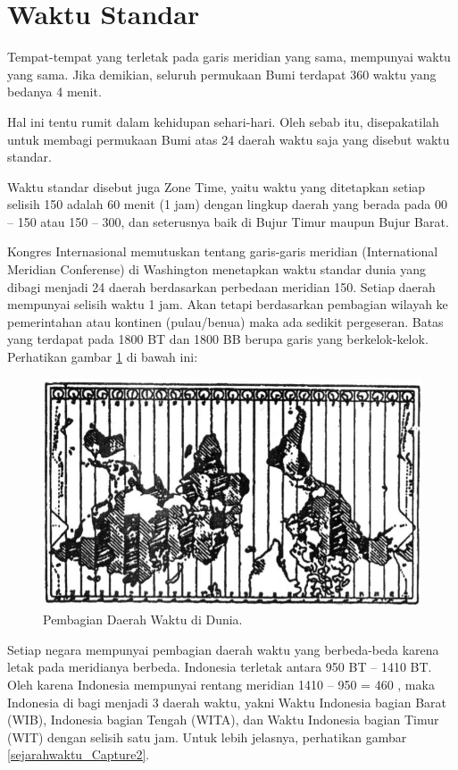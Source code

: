 \section{Waktu Standar}
Tempat-tempat yang terletak pada garis meridian yang sama, mempunyai waktu yang sama.
 Jika demikian, seluruh permukaan Bumi terdapat 360 waktu yang bedanya 4 menit.

 Hal ini tentu rumit dalam kehidupan sehari-hari. Oleh sebab itu, disepakatilah untuk
 membagi permukaan Bumi atas 24 daerah waktu saja yang disebut waktu standar.
 
 Waktu standar disebut juga Zone Time, yaitu waktu yang ditetapkan setiap 
 selisih 150 adalah 60 menit (1 jam) dengan lingkup daerah yang berada pada 00 – 150
 atau 150 – 300, dan seterusnya baik di Bujur Timur maupun Bujur Barat.

 Kongres Internasional memutuskan tentang garis-garis meridian (International Meridian Conferense) 
 di Washington menetapkan waktu standar dunia yang dibagi menjadi 24 daerah berdasarkan
 perbedaan meridian 150. Setiap daerah mempunyai selisih waktu 1 jam.
 Akan tetapi berdasarkan pembagian wilayah ke pemerintahan atau kontinen (pulau/benua)
 maka ada sedikit pergeseran. Batas yang terdapat pada 1800 BT dan 1800 BB berupa garis
 yang berkelok-kelok. Perhatikan gambar \ref{sejarahwaktu_Capture1} di bawah ini:
 
 \begin{figure}[ht]
 \centerline{\includegraphics[width=1\textwidth]{figures/sejarahwaktu_dunia}}
 \caption{Pembagian Daerah Waktu di Dunia.}
 \label{sejarahwaktu_Capture1}
 \end{figure}
 

 
Setiap negara mempunyai pembagian daerah waktu yang berbeda-beda karena letak pada meridianya berbeda. 
 Indonesia terletak antara 950 BT – 1410 BT. Oleh karena Indonesia mempunyai rentang meridian 1410 – 950 = 460 , 
 maka Indonesia di bagi menjadi 3 daerah waktu, yakni Waktu Indonesia bagian Barat (WIB),
 Indonesia bagian Tengah (WITA), dan Waktu Indonesia bagian Timur (WIT) dengan selisih
 satu jam. Untuk lebih jelasnya, perhatikan gambar \ref{sejarahwaktu_Capture2}.

